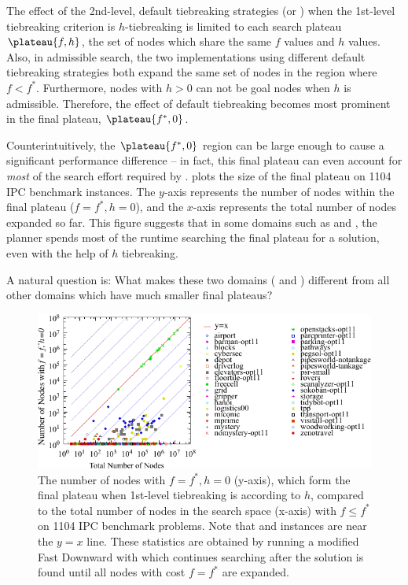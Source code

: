 The effect of the 2nd-level, default tiebreaking strategies (\lifo or
\fifo)  when the 1st-level tiebreaking criterion is  $h$-tiebreaking is
limited to each search plateau $\plateau{f,h}$, the set of nodes which
share the same $f$ values and $h$ values.
% 
Also, in admissible search, the two \astar implementations using 
different default tiebreaking strategies both expand the same set of
nodes in the region where $f<f^*$.
% 
Furthermore, nodes with $h>0$ can not be goal nodes when $h$ is admissible.
% 
Therefore, the effect of default tiebreaking becomes most prominent in the final plateau, $\plateau{f^*,0}$.

Counterintuitively, the $\plateau{f^*, 0}$ region can be large enough to
cause a significant performance difference -- in fact, this final plateau can even account for \emph{most} of the
search effort required by \astar.
 plots the size of the final plateau on 1104 IPC
benchmark instances.  The $y$-axis represents the number of nodes within
the final plateau ($f=f^*, h=0$), and the $x$-axis represents the total
number of nodes expanded so far. This figure suggests that in some
domains such as  and , the planner
spends most of the runtime searching the final plateau for a solution,
even with the help of $h$ tiebreaking.

A natural question is:  What makes these two domains
( and )  different from all other domains
which have much smaller final plateaus?

\begin{figure}[htbp]
   \centering
  \includegraphics{tables/aaai16-frontier/aaai16prelim3/lmcut_frontier-front.pdf}
  \caption{
 The number of nodes with $f=f^*, h=0$ (y-axis), which form
  the final plateau when 1st-level tiebreaking is according to $h$, compared to
  the total number of nodes in the search space (x-axis) with $f\leq
  f^*$ on 1104 IPC benchmark problems.  Note that 
  and  instances are near the $y=x$ line.
  These statistics are obtained by running a modified Fast Downward with
 \lmcut which continues searching after the solution is found
 until all nodes with cost $f=f^*$ are expanded.} \label{fig:plateau}
\end{figure}

